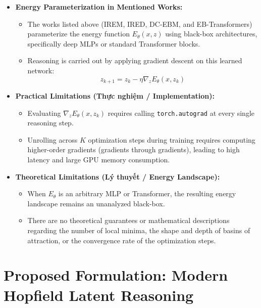 \documentclass[11pt,a4paper]{article}
\begin{document}
\begin{itemize}[leftmargin=1.5em]
    \item \textbf{Energy Parameterization in Mentioned Works:}
    \begin{itemize}[leftmargin=1.2em]
        \item The works listed above (IREM, IRED, DC-EBM, and EB-Transformers) parameterize the energy function $E_\theta(x, z)$ using black-box architectures, specifically deep MLPs or standard Transformer blocks.
        \item Reasoning is carried out by applying gradient descent on this learned network:
        \begin{equation}
            z_{k+1} = z_k - \eta \nabla_z E_\theta(x, z_k)
        \end{equation}
    \end{itemize}

    \item \textbf{Practical Limitations (Thực nghiệm / Implementation):}
    \begin{itemize}[leftmargin=1.2em]
        \item Evaluating $\nabla_z E_\theta(x, z_k)$ requires calling \texttt{torch.autograd} at every single reasoning step.
        \item Unrolling across $K$ optimization steps during training requires computing higher-order gradients (gradients through gradients), leading to high latency and large GPU memory consumption.
    \end{itemize}

    \item \textbf{Theoretical Limitations (Lý thuyết / Energy Landscape):}
    \begin{itemize}[leftmargin=1.2em]
        \item When $E_\theta$ is an arbitrary MLP or Transformer, the resulting energy landscape remains an unanalyzed black-box.
        \item There are no theoretical guarantees or mathematical descriptions regarding the number of local minima, the shape and depth of basins of attraction, or the convergence rate of the optimization steps.
    \end{itemize}
\end{itemize}

\section{Proposed Formulation: Modern Hopfield Latent Reasoning}
\label{sec:formulation}
\end{document}
